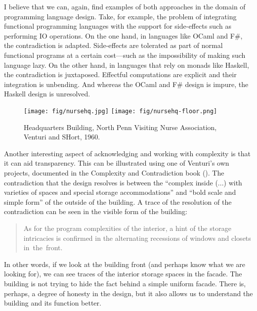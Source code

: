 I believe that we can, again, find examples of both approaches in the domain of programming
language design. Take, for example, the problem of integrating functional programming languages
with the support for side-effects such as performing IO operations. On the one hand, in languages
like OCaml and F\#, the contradiction is adapted. Side-effects are tolerated as part of normal
functional programs at a certain cost---such as the impossibility of making such language lazy.
On the other hand, in languages that rely on monads like Haskell, the contradiction is juxtaposed.
Effectful computations are explicit and their integration is unbending. And whereas the OCaml and
F\# design is impure, the Haskell design is unresolved.

\begin{figure}
\centering
\texttt{[image: fig/nursehq.jpg]}\quad
\texttt{[image: fig/nursehq-floor.png]}
\caption{Headquarters Building, North Penn Visiting Nurse Association, Venturi and SHort, 1960.}
\label{fig:nursehq}
\end{figure}

Another interesting aspect of acknowledging and working with complexity is that it can aid
transparency. This can be illustrated using one of Venturi's own projects, documented in the
Complexity and Contradiction book (). The contradiction that the design
resolves is between the ``complex inside (...) with varieties of spaces and special storage
accommodations'' and ``bold scale and simple form'' of the outside of the building. A trace of
the resolution of the contradiction can be seen in the visible form of the building:

\begin{quote}
As for the program complexities of the interior, a hint of the storage intricacies is
confirmed in the alternating recessions of windows and closets in~the~front.
\end{quote}

In other words, if we look at the building front (and perhaps know what we are looking for),
we can see traces of the interior storage spaces in the facade. The building is not trying to
hide the fact behind a simple uniform facade. There is, perhaps, a degree of honesty in the
design, but it also allows us to understand the building and its function better.

